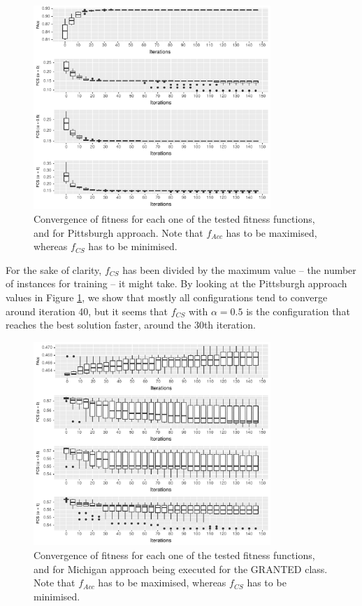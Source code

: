 \documentclass[runningheads]{llncs}
\begin{document}
\begin{figure}[h!tb]
\centering
\includegraphics[width=0.8\textwidth]{img/pittsburghItvsF.pdf}
\caption{Convergence of fitness for each one of the tested fitness
  functions, and for Pittsburgh approach. Note that $f_{Acc}$ has to
  be maximised, whereas $f_{CS}$ has to be minimised.}
\label{fig:pittsburghItvsF}
\end{figure}

For the sake of clarity, $f_{CS}$ has been divided by the maximum
value -- the number of instances for training -- it might take. By
looking at the Pittsburgh approach values in Figure
\ref{fig:pittsburghItvsF}, we show that mostly all configurations tend to converge around iteration 40, but it seems that $f_{CS}$ with
$\alpha = 0.5$ is the configuration that reaches the best solution
faster, around the 30th iteration.  

\begin{figure}[h!tb]
	\centering
	\includegraphics[width=0.8\textwidth]{img/michiganItvsF_allow.pdf}
	\caption{Convergence of fitness for each one of the tested fitness functions, and for Michigan approach being executed for the GRANTED class. Note that $f_{Acc}$ has to be maximised, whereas $f_{CS}$ has to be minimised.}
	\label{fig:michiganItvsF_allow}
\end{figure}
\end{document}

